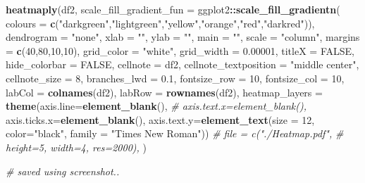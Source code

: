 \documentclass[
]{article}
\newenvironment{Shaded}{\begin{snugshade}}{\end{snugshade}}
\newcommand{\AttributeTok}[1]{\textcolor[rgb]{0.13,0.29,0.53}{#1}}
\newcommand{\CommentTok}[1]{\textcolor[rgb]{0.56,0.35,0.01}{\textit{#1}}}
\newcommand{\ConstantTok}[1]{\textcolor[rgb]{0.56,0.35,0.01}{#1}}
\newcommand{\DecValTok}[1]{\textcolor[rgb]{0.00,0.00,0.81}{#1}}
\newcommand{\FloatTok}[1]{\textcolor[rgb]{0.00,0.00,0.81}{#1}}
\newcommand{\FunctionTok}[1]{\textcolor[rgb]{0.13,0.29,0.53}{\textbf{#1}}}
\newcommand{\NormalTok}[1]{#1}
\newcommand{\SpecialCharTok}[1]{\textcolor[rgb]{0.81,0.36,0.00}{\textbf{#1}}}
\newcommand{\StringTok}[1]{\textcolor[rgb]{0.31,0.60,0.02}{#1}}
\begin{document}
\begin{Shaded}
\begin{Highlighting}[]
\FunctionTok{heatmaply}\NormalTok{(df2,}
              \AttributeTok{scale\_fill\_gradient\_fun =}\NormalTok{ ggplot2}\SpecialCharTok{::}\FunctionTok{scale\_fill\_gradientn}\NormalTok{(}
                \AttributeTok{colours =} \FunctionTok{c}\NormalTok{(}\StringTok{"darkgreen"}\NormalTok{,}\StringTok{"lightgreen"}\NormalTok{,}\StringTok{"yellow"}\NormalTok{,}\StringTok{"orange"}\NormalTok{,}\StringTok{"red"}\NormalTok{,}\StringTok{"darkred"}\NormalTok{)),}
              \AttributeTok{dendrogram =} \StringTok{"none"}\NormalTok{,}
              \AttributeTok{xlab =} \StringTok{""}\NormalTok{, }\AttributeTok{ylab =} \StringTok{""}\NormalTok{,}
              \AttributeTok{main =} \StringTok{""}\NormalTok{,}
              \AttributeTok{scale =} \StringTok{"column"}\NormalTok{,}
              \AttributeTok{margins =} \FunctionTok{c}\NormalTok{(}\DecValTok{40}\NormalTok{,}\DecValTok{80}\NormalTok{,}\DecValTok{10}\NormalTok{,}\DecValTok{10}\NormalTok{),}
              \AttributeTok{grid\_color =} \StringTok{"white"}\NormalTok{,}
              \AttributeTok{grid\_width =} \FloatTok{0.00001}\NormalTok{,}
              \AttributeTok{titleX =} \ConstantTok{FALSE}\NormalTok{,}
              \AttributeTok{hide\_colorbar =} \ConstantTok{FALSE}\NormalTok{,}
              \AttributeTok{cellnote =}\NormalTok{ df2,}
              \AttributeTok{cellnote\_textposition =} \StringTok{"middle center"}\NormalTok{,}
              \AttributeTok{cellnote\_size =} \DecValTok{8}\NormalTok{,}
              \AttributeTok{branches\_lwd =} \FloatTok{0.1}\NormalTok{,}
              \AttributeTok{fontsize\_row =} \DecValTok{10}\NormalTok{,}
              \AttributeTok{fontsize\_col =} \DecValTok{10}\NormalTok{,}
              \AttributeTok{labCol =} \FunctionTok{colnames}\NormalTok{(df2),}
              \AttributeTok{labRow =} \FunctionTok{rownames}\NormalTok{(df2),}
              \AttributeTok{heatmap\_layers =} \FunctionTok{theme}\NormalTok{(}\AttributeTok{axis.line=}\FunctionTok{element\_blank}\NormalTok{(),}
                                     \CommentTok{\# axis.text.x=element\_blank(),}
                                     \AttributeTok{axis.ticks.x=}\FunctionTok{element\_blank}\NormalTok{(),}
                                     \AttributeTok{axis.text.y=}\FunctionTok{element\_text}\NormalTok{(}\AttributeTok{size =} \DecValTok{12}\NormalTok{,}
                                                              \AttributeTok{color=}\StringTok{"black"}\NormalTok{,}
                                                              \AttributeTok{family =} \StringTok{"Times New Roman"}\NormalTok{))}
              \CommentTok{\# file = c("./Heatmap.pdf",}
              \CommentTok{\#          height=5, width=4, res=2000),}
\NormalTok{)}

 \CommentTok{\# saved using screenshot..}
\end{Highlighting}
\end{Shaded}
\end{document}
